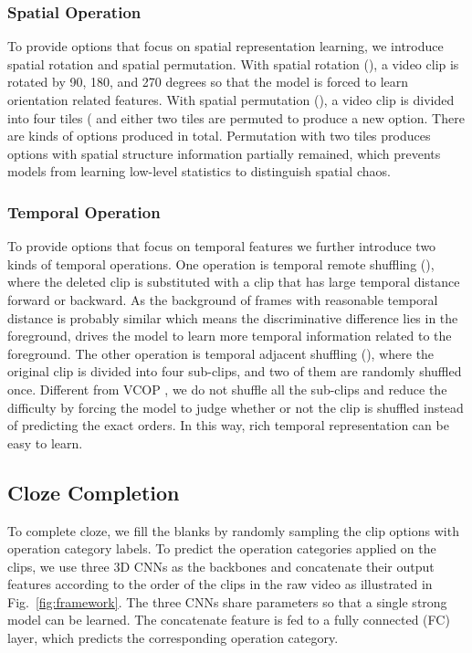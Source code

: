 \documentclass[letterpaper]{article}
\begin{document}
\subsubsection{Spatial Operation}
 To provide options that focus on spatial representation learning, we introduce spatial rotation and spatial permutation.
With spatial rotation (), a video clip is rotated by 90, 180, and 270 degrees so that the model is forced to learn orientation related features.
With spatial permutation (), a video clip is divided into four tiles ( and either two tiles are permuted to produce a new option. There are  kinds of options produced in total. Permutation with two tiles produces options with spatial structure information partially remained, which prevents models from learning low-level statistics to distinguish spatial chaos.
 
\subsubsection{Temporal Operation}
 To provide options that focus on temporal features we further introduce two kinds of temporal operations.
One operation is temporal remote shuffling (), where the deleted clip is substituted with a clip that has large temporal distance forward or backward. As the background of frames with reasonable temporal distance is probably similar which means the discriminative difference lies in the foreground,  drives the model to learn more temporal information related to the foreground.
The other operation is temporal adjacent shuffling (), where the original clip is divided into four sub-clips, and two of them are randomly shuffled once. Different from VCOP \cite{xu2019self}, we do not shuffle all the sub-clips and reduce the difficulty by forcing the model to judge whether or not the clip is shuffled instead of predicting the exact orders. In this way, rich temporal representation can be easy to learn.


 \subsection{Cloze Completion}
To complete cloze, we fill the blanks by randomly sampling the clip options with operation category labels.
To predict the operation categories applied on the clips, we use three 3D CNNs as the backbones and concatenate their output features according to the order of the clips in the raw video as illustrated in  Fig.\ \ref{fig:framework}. 
The three CNNs share parameters so that a single strong model can be learned.
The concatenate feature is fed to a fully connected (FC) layer, which predicts the corresponding operation category. 
\end{document}

